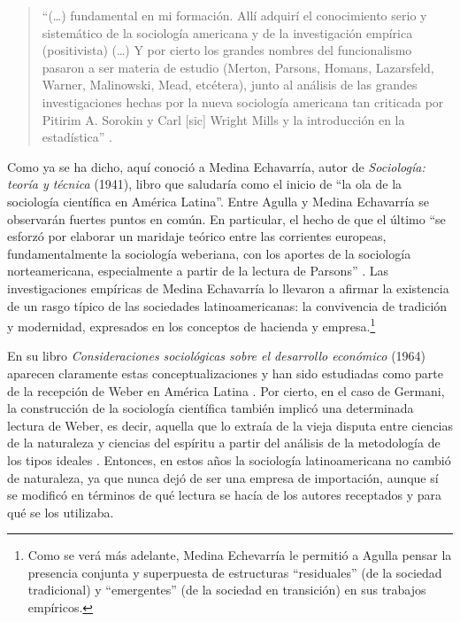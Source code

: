 \begin{quote}
\enquote{(\dots) fundamental en mi formación. Allí adquirí el conocimiento serio y sistemático de la sociología americana y de la investigación empírica (positivista) (\dots) Y por cierto los grandes nombres del funcionalismo pasaron a ser materia de estudio (Merton, Parsons, Homans, Lazarsfeld, Warner, Malinowski, Mead, etcétera), junto al análisis de las grandes investigaciones hechas por la nueva sociología americana tan criticada por Pitirim A. Sorokin y Carl [sic] Wright Mills y la introducción en la estadística} \parencite[83]{1634-AGULLA1997}.
\end{quote}

Como ya se ha dicho, aquí conoció a Medina Echavarría, autor de \emph{Sociología: teoría y técnica} (1941), libro que \textcite[148]{1681-GERMANI1964} saludaría como el inicio de \enquote{la ola de la sociología científica en América Latina}. Entre Agulla y Medina Echavarría se observarán fuertes puntos en común. En particular, el hecho de que el último \enquote{se esforzó por elaborar un maridaje teórico entre las corrientes europeas, fundamentalmente la sociología weberiana, con los aportes de la sociología norteamericana, especialmente a partir de la lectura de Parsons} \parencite[620]{1699-MORALESMARTIN2016}. Las investigaciones empíricas de Medina Echavarría lo llevaron a afirmar la existencia de un rasgo típico de las sociedades latinoamericanas: la convivencia de tradición y modernidad, expresados en los conceptos de hacienda y empresa.\footnote{Como se verá más adelante, Medina Echevarría le permitió a Agulla pensar la presencia conjunta y superpuesta de estructuras \enquote{residuales} (de la sociedad tradicional) y \enquote{emergentes} (de la sociedad en transición) en sus trabajos empíricos.}

En su libro \emph{Consideraciones sociológicas sobre el desarrollo económico} (1964) aparecen claramente estas conceptualizaciones y han sido estudiadas como parte de la recepción de Weber en América Latina \parencite{1541-PEON1998}. Por cierto, en el caso de Germani, la construcción de la sociología científica también implicó una determinada lectura de Weber, es decir, aquella que lo extraía de la vieja disputa entre ciencias de la naturaleza y ciencias del espíritu a partir del análisis de la metodología de los tipos ideales \parencite{1566-BLANCO2007}. Entonces, en estos años la sociología latinoamericana no cambió de naturaleza, ya que nunca dejó de ser una empresa de importación, aunque sí se modificó en términos de qué lectura se hacía de los autores receptados y para qué se los utilizaba.

